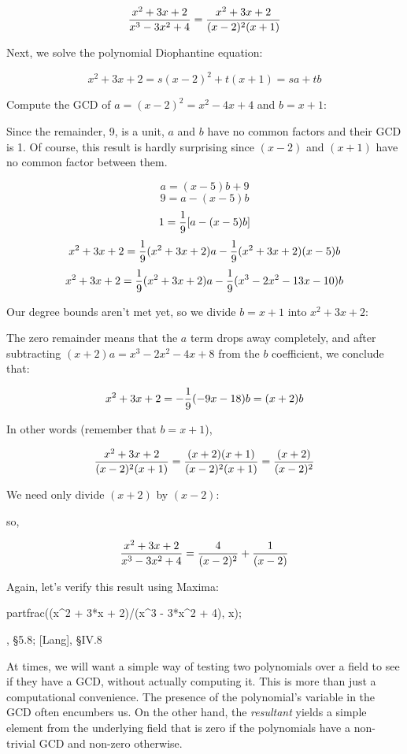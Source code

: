 $${{x^2 + 3x + 2}\over{x^3-3x^2+4}} = {{x^2 + 3x + 2}\over{(x-2)^2(x+1)}}$$

Next, we solve the polynomial Diophantine equation:

$$x^2 + 3x + 2 = s(x-2)^2 + t(x+1) = sa+tb$$

Compute the GCD of $a=(x-2)^2=x^2-4x+4$ and $b=x+1$:



Since the remainder, 9, is a unit, $a$ and $b$ have no common
factors and their GCD is 1.  Of course, this result is hardly
surprising since $(x-2)$ and $(x+1)$
have no common factor between them.

$$a=(x-5)b+9$$
$$9=a-(x-5)b$$
$$1={1\over9}[a-(x-5)b]$$
$$x^2 + 3x + 2 = {1\over9}(x^2+3x+2)a-{1\over9}(x^2+3x+2)(x-5)b$$
$$x^2 + 3x + 2 = {1\over9}(x^2+3x+2)a-{1\over9}(x^3-2x^2-13x-10)b$$

Our degree bounds aren't met yet, so we divide $b=x+1$ into $x^2+3x+2$:



The zero remainder means that the $a$ term drops away completely,
and after subtracting $(x+2)a=x^3-2x^2-4x+8$ from the $b$ coefficient,
we conclude that:

$$x^2 + 3x + 2 = -{1\over9}(-9x-18)b = (x+2)b$$

In other words (remember that $b=x+1$),

$${{x^2 + 3x + 2}\over{(x-2)^2(x+1)}} = {{(x+2)(x+1)}\over{(x-2)^2(x+1)}} = {{(x+2)}\over{(x-2)^2}}$$

We need only divide $(x+2)$ by $(x-2)$:




so,

$${{x^2 + 3x + 2}\over{x^3-3x^2+4}} = {4\over{(x-2)^2}} + {1\over{(x-2)}}$$

Again, let's verify this result using Maxima:

\begin{maximacode}
partfrac((x^2 + 3*x + 2)/(x^3 - 3*x^2 + 4), x);
\end{maximacode}

\endexample

\vfill\eject


, \S5.8; [Lang], \S IV.8

At times, we will want a simple way of testing two polynomials over a
field to see if they have a GCD, without actually computing it.  This
is more than just a computational convenience.  The presence of the
polynomial's variable in the GCD often encumbers us.  On the other
hand, the {\it resultant} yields a simple element from the underlying
field that is zero if the polynomials have a non-trivial GCD and
non-zero otherwise.

